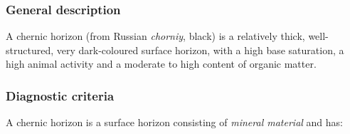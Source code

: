 \documentclass[
  letterpaper,
  DIV=11,
  numbers=noendperiod]{scrreprt}
\begin{document}
\hypertarget{general-description-5}{%
\subsubsection{General description}\label{general-description-5}}

A chernic horizon (from Russian \emph{chorniy}, black) is a relatively
thick, well-structured, very dark-coloured surface horizon, with a high
base saturation, a high animal activity and a moderate to high content
of organic matter.

\hypertarget{diagnostic-criteria-5}{%
\subsubsection{Diagnostic criteria}\label{diagnostic-criteria-5}}

A chernic horizon is a surface horizon consisting of \emph{mineral
material} and has:
\end{document}
